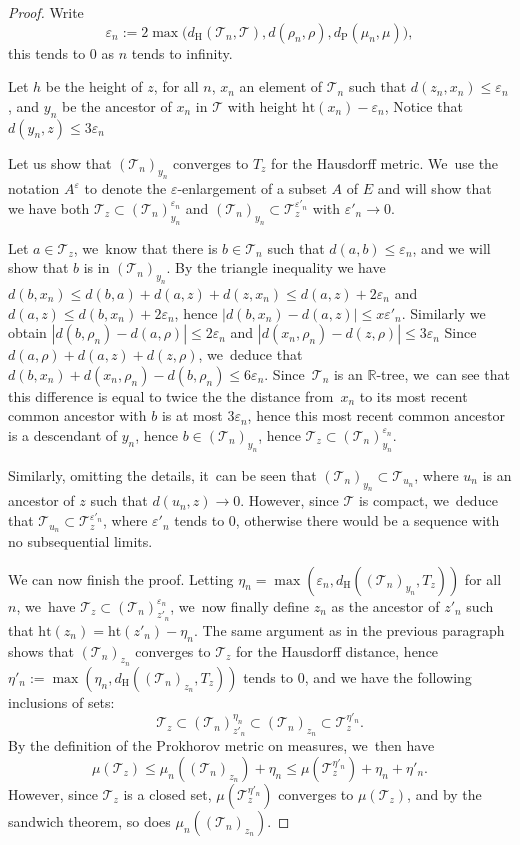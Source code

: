 \documentclass[11pt]{article}
\newcommand{\R}{{\mathbb{R}}}
\newcommand{\T}{\mathcal{T}}\let\CRT\T\let\tbr\T
\let\veps\varepsilon
\theoremstyle{definition}
\begin{document}
\begin{proof}
Write
\[
\veps_n := 2 \max\bigl(d_{\mathrm{H}}(\T_n,\T) , d(\rho_n,\rho), d_{\mathrm{P}}(\mu_n,\mu)\bigr),
\]
this tends to $0$ as $n$ tends to infinity.

Let $h$ be the height of $z$, for all $n$, $x_n$ an element of $\T_n$ such that $d(z_n,x_n)\leq \veps_n$, and $y_n$ be the ancestor of $x_n$ in $\T$ with height $\mathrm{ht}(x_n)-\veps_n$, Notice that $d(y_n,z)\leq 3\veps_n$

Let us show that $(\T_n)_{y_n}$ converges to $T_z$ for the Hausdorff metric. We~use the notation $A^{\veps}$ to denote the $\veps$-enlargement of a subset $A$ of $E$ and will show that we have both $\T_z\subset (\T_n)_{y_n}^{\veps_n}$ and $(\T_n)_{y_n}\subset \T_z^{\veps'_n}$ with $\veps'_n\to 0$.

Let $a\in \T_z$, we~know that there is $b\in \T_n$ such that $d(a,b)\leq \veps_n$, and we will show that $b$ is in $(\T_n)_{y_n}$. By the triangle inequality we have $d(b,x_n)\leq d(b,a)+d(a,z)+d(z,x_n)\leq d(a,z)+2\veps_n$ and $d(a,z)\leq d(b,x_n)+2\veps_n$, hence $|d(b,x_n)-d(a,z)|\leq x\veps'_n$. Similarly we obtain $|d(b,\rho_n)-d(a,\rho)|\leq 2\veps_n$ and $|d(x_n,\rho_n)-d(z,\rho)|\leq 3\veps_n$ Since $d(a,\rho)+d(a,z)+d(z,\rho)$, we~deduce that $d(b,x_n)+d(x_n,\rho_n)-d(b,\rho_n)\leq 6\veps_n$. Since~$\T_n$ is an $\R$-tree, we~can see that this difference is equal to twice the the distance from~$x_n$ to its most recent common ancestor with $b$ is at most $3\veps_n$, hence this most recent common ancestor is a descendant of $y_n$, hence $b\in (\T_n)_{y_n}$, hence $\T_z\subset (\T_n)_{y_n}^{\veps_n}$.

Similarly, omitting the details, it~can be seen that $(\T_n)_{y_n}\subset \T_{u_n}$, where $u_n$ is an ancestor of $z$ such that $d(u_n,z)\to 0$. However, since $\T$ is compact, we~deduce that $\T_{u_n}\subset \T_z^{\veps'_n}$, where $\veps'_n$ tends to $0$, otherwise there would be a sequence with no subsequential limits.

We can now finish the proof. Letting $\eta_n=\max(\veps_n,d_{\mathrm{H}}((\T_n)_{y_n},T_z))$ for all $n$, we~have $\T_z\subset (\T_n)^{\veps_n}_{z'_n}$, we~now finally define $z_n$ as the ancestor of $z'_n$ such that $\mathrm{ht}(z_n)=\mathrm{ht}(z'_n)-\eta_n$. The same argument as in the previous paragraph shows that $(\T_n)_{z_n}$ converges to $\T_z$ for the Hausdorff distance, hence $\eta'_n:=\max(\eta_n,d_{\mathrm{H}}((\T_n)_{z_n},T_z))$ tends to $0$, and we have the following inclusions of sets:
\[
\T_z\subset (\T_n)_{z'_n}^{\eta_n} \subset (\T_n)_{z_n} \subset \T_z^{\eta'_n}.
\]
By the definition of the Prokhorov metric on measures, we~then have
\[
\mu(\T_z)\leq \mu_n((\T_n)_{z_n})+\eta_n\leq \mu(\T_z^{\eta'_n})+\eta_n+\eta'_n.
\]
However, since $\T_z$ is a closed set, $\mu(\T_z^{\eta'_n})$ converges to $\mu(\T_z)$, and by the sandwich theorem, so does $\mu_n((\T_n)_{z_n})$.
\end{proof}
\end{document}

